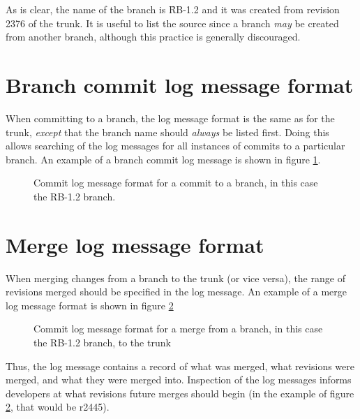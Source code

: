 As is clear, the name of the branch is \f{RB-1.2} and it was created from revision 2376 of the trunk. It is useful to list the source since a branch \textit{may} be created from another branch, although this practice is generally discouraged.


\section{Branch commit log message format}
When committing to a branch, the log message format is the same as for the trunk, \textit{except} that the branch name should \textit{always} be listed first. Doing this allows searching of the log messages for all instances of commits to a particular branch. An example of a branch commit log message is shown in figure \ref{fig:branch_commit_log_format}.
\begin{figure}[htp]
  \centering
  \caption{Commit log message format for a commit to a branch, in this case the RB-1.2 branch.}
  \label{fig:branch_commit_log_format}
\end{figure}

\section{Merge log message format}
When merging changes from a branch to the trunk (or vice versa), the range of revisions merged should be specified in the log message. An example of a merge log message format is shown in figure \ref{fig:merge_commit_log_format}

\begin{figure}[htp]
  \centering
  \caption{Commit log message format for a merge from a branch, in this case the RB-1.2 branch, to the trunk}
  \label{fig:merge_commit_log_format}
\end{figure}

Thus, the log message contains a record of what was merged, what revisions were merged, and what they were merged into. Inspection of the log messages informs developers at what revisions future merges should begin (in the example of figure \ref{fig:merge_commit_log_format}, that would be r2445).

